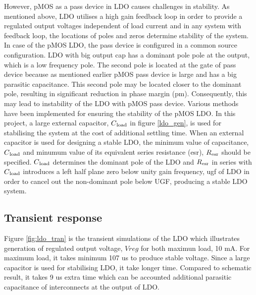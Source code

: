 \documentclass[12pt,a4paper,UKenglish]{article}
\begin{document}
However, pMOS as a pass device in LDO causes challenges in stability. As mentioned above, LDO utilises a high 
gain feedback loop in order to provide a regulated output voltages independent of load current and in any system 
with feedback loop, the locations of poles and zeros determine stability of the system.  In case of the pMOS LDO, 
the pass device is configured in a common source configuration. LDO with big output cap has a dominant pole pole 
at the output, which is a low frequency pole. The second pole is located at the gate of pass device because as 
mentioned earlier pMOS pass device is large and has a big parasitic capacitance. This second pole may be located 
closer to the dominant pole, resulting in significant  reduction in phase margin (\acrshort{pm}). Consequently, 
this may lead to instability of the LDO with pMOS pass device.  Various methods have been implemented for 
ensuring the stability of the pMOS LDO. In this project, a large external capacitor, $C\textsubscript{load}$ in 
figure \ref{ldo_gen}, is used for stabilising the system at the cost of additional settling time. When an 
external capacitor is used for designing a stable LDO, the minimum value of capacitance, $C\textsubscript{load}$ 
and minumum value of its equivalent series resistance (\acrshort{esr}), $R\textsubscript{esr}$ should be 
specified\cite{ldo_ti_stability}. $C\textsubscript{load}$ determines the dominant pole of the LDO and 
$R\textsubscript{esr}$ in series with $C\textsubscript{load}$ introduces a left half plane zero below unity 
gain frequency, \acrshort{ugf} of LDO in order to cancel out the non-dominant pole below UGF, producing a 
stable LDO system. \\

\subsection{Transient response}

Figure \ref{fig:ldo_tran} is the transient simulations of the LDO which illustrates generation of  regulated output voltage, $Vreg$ for 
both maximun load, 10 mA. For maximum load, it takes minimum 107 us to produce stable voltage. Since a large capacitor is used for stabilising 
LDO, it take longer time. Compared to schematic result, it takes 9 us extra time which can be accounted additional parasitic capacitance of interconnects 
at the output of LDO.\\
\end{document}
